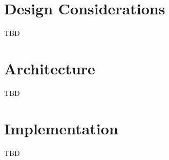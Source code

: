 \documentclass[sigconf]{acmart}
\def\BibTeX{\textsc{Bib}\TeX}
\begin{document}
    

\section{Design Considerations}
\label{design considerations}
TBD

\section{Architecture}
\label{architecture}
TBD

\section{Implementation}
\label{implementation}
TBD

\end{document}
